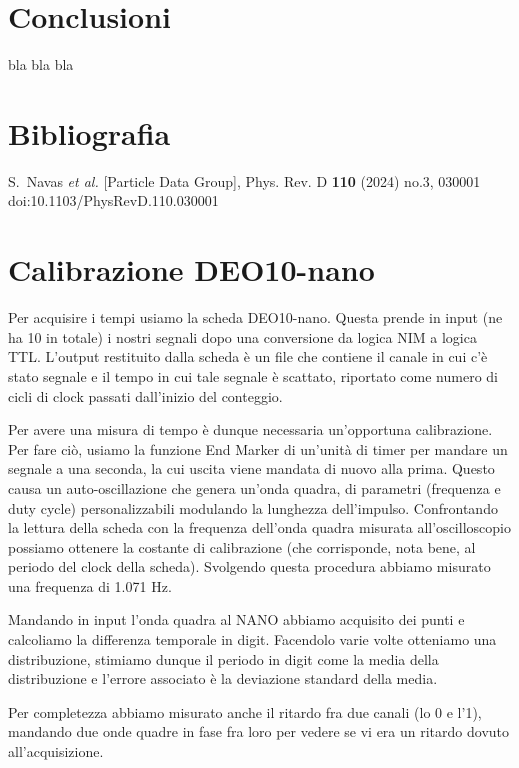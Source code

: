 \documentclass[10pt,a4paper]{article}
\begin{document}
\section{Conclusioni}
bla bla bla



\section{Bibliografia}
S.~Navas \textit{et al.} [Particle Data Group],
Phys. Rev. D \textbf{110} (2024) no.3, 030001
doi:10.1103/PhysRevD.110.030001

\newpage
\appendix
\section{Calibrazione DEO10-nano}
Per acquisire i tempi usiamo la scheda DEO10-nano. Questa prende in input (ne ha 10 in totale) i nostri segnali dopo una conversione da logica NIM a logica TTL. L'output restituito dalla scheda è un file che contiene il canale in cui c'è stato segnale e il tempo in cui tale segnale è scattato, riportato come numero di cicli di clock passati dall'inizio del conteggio. 

Per avere una misura di tempo è dunque necessaria un'opportuna calibrazione.
Per fare ciò, usiamo la funzione End Marker di un'unità di timer per mandare un segnale a una seconda, la cui uscita viene mandata di nuovo alla prima. Questo causa un auto-oscillazione che genera un'onda quadra, di parametri (frequenza e duty cycle) personalizzabili modulando la lunghezza dell'impulso.
Confrontando la lettura della scheda con la frequenza dell'onda quadra misurata all'oscilloscopio possiamo ottenere la costante di calibrazione (che corrisponde, nota bene, al periodo del clock della scheda). Svolgendo questa procedura abbiamo misurato una frequenza di 1.071 Hz.

Mandando in input l'onda quadra al NANO abbiamo acquisito dei punti e calcoliamo la differenza temporale in digit. Facendolo varie volte otteniamo una distribuzione, stimiamo dunque il periodo in digit come la media della distribuzione e l'errore associato è la deviazione standard della media. 

Per completezza abbiamo misurato anche il ritardo fra due canali (lo 0 e l'1), mandando due onde quadre in fase fra loro per vedere se vi era un ritardo dovuto all'acquisizione.
\end{document}
